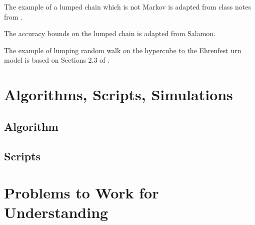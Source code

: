 \documentclass[12pt]{article}
\begin{document}
The example of a lumped chain which is not Markov is adapted from class
notes from .

The accuracy bounds on the lumped chain is adapted from 
{Salamon}.

The example of lumping random walk on the hypercube to the Ehrenfest urn
model is based on Sections 2.3 of
\cite{levin09}.

\nocite{}
\nocite{}

\hr

\section*{Algorithms, Scripts, Simulations}

\subsection*{Algorithm}

\subsection*{Scripts}


\hr

\section*{Problems to Work for Understanding}
\renewcommand{\theexerciseseries}{}
\renewcommand{\theexercise}{\arabic{exercise}}
\end{document}
